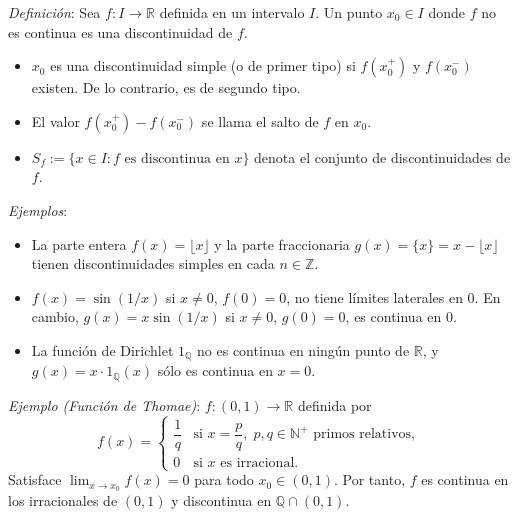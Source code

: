 \documentclass{beamer}
\begin{document}
  \begin{frame}
    \textit{Definición}: Sea $f: I \to \mathbb{R}$ definida en un intervalo $I$. Un punto 
    $x_0 \in I$ donde $f$ no es continua es una discontinuidad de $f$.
    \begin{itemize}[<+->]
      \item $x_0$ es una discontinuidad simple (o de primer tipo) si $f(x_0^+)$ y 
      $f(x_0^-)$ existen. De lo contrario, es de segundo tipo.
      \item El valor $f(x_0^+) - f(x_0^-)$ se llama el salto de $f$ en $x_0$.
      \item $S_f := \{x \in I : f \text{ es discontinua en } x\}$ denota el conjunto de 
      discontinuidades de $f$.
    \end{itemize}
  \end{frame}

  \begin{frame}
    \textit{Ejemplos}:
    \begin{itemize}[<+->]
      \item La parte entera $f(x) = \lfloor x \rfloor$ y la parte fraccionaria 
      $g(x) = \{x\} = x - \lfloor x \rfloor$ tienen discontinuidades simples en cada 
      $n \in \mathbb{Z}$.
      \item $f(x) = \sin(1/x)$ si $x \neq 0$, $f(0) = 0$, no tiene límites laterales en 
      $0$. En cambio, $g(x) = x \sin(1/x)$ si $x \neq 0$, $g(0) = 0$, es continua en $0$.
      \item La función de Dirichlet $1_{\mathbb{Q}}$ no es continua en ningún punto de 
      $\mathbb{R}$, y $g(x) = x \cdot 1_{\mathbb{Q}}(x)$ sólo es continua en $x = 0$.
    \end{itemize}
  \end{frame}

  \begin{frame}
    \textit{Ejemplo (Función de Thomae)}: $f: (0, 1) \to \mathbb{R}$ definida por
    \[
      f(x) = \begin{cases} \dfrac{1}{q} & \text{si } x = \dfrac{p}{q}, \; p, q \in \mathbb{N}^+ 
      \text{ primos relativos}, \\[2mm] 0 & \text{si } x \text{ es irracional.} \end{cases}
    \]
    Satisface $\lim_{x \to x_0} f(x) = 0$ para todo $x_0 \in (0, 1)$. Por tanto, $f$ es 
    continua en los irracionales de $(0, 1)$ y discontinua en $\mathbb{Q} \cap (0, 1)$.
  \end{frame}
\end{document}

